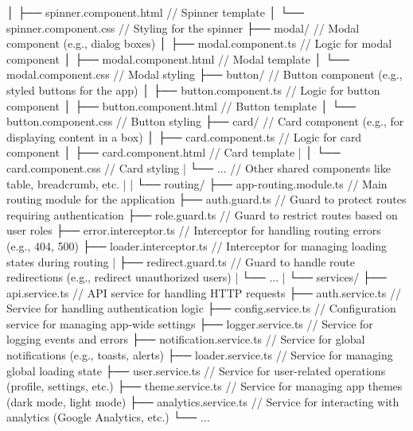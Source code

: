                 │   ├── spinner.component.html // Spinner template
                │   └── spinner.component.css  // Styling for the spinner
                ├── modal/                 // Modal component (e.g., dialog boxes)
                │   ├── modal.component.ts    // Logic for modal component
                │   ├── modal.component.html  // Modal template
                │   └── modal.component.css   // Modal styling
                ├── button/                // Button component (e.g., styled buttons for the app)
                │   ├── button.component.ts   // Logic for button component
                │   ├── button.component.html // Button template
                │   └── button.component.css  // Button styling
                ├── card/                  // Card component (e.g., for displaying content in a box)
                │   ├── card.component.ts     // Logic for card component
                │   ├── card.component.html   // Card template
        |       │   └── card.component.css    // Card styling
        |       └── ...                    // Other shared components like table, breadcrumb, etc.
        |
        |
        └── routing/
            ├── app-routing.module.ts       // Main routing module for the application
            ├── auth.guard.ts               // Guard to protect routes requiring authentication
            ├── role.guard.ts               // Guard to restrict routes based on user roles
            ├── error.interceptor.ts        // Interceptor for handling routing errors (e.g., 404, 500)
            ├── loader.interceptor.ts       // Interceptor for managing loading states during routing
        |   ├── redirect.guard.ts           // Guard to handle route redirections (e.g., redirect unauthorized users)
        |   └── ...
        |
        └── services/
            ├── api.service.ts                // API service for handling HTTP requests
            ├── auth.service.ts               // Service for handling authentication logic
            ├── config.service.ts            // Configuration service for managing app-wide settings
            ├── logger.service.ts            // Service for logging events and errors
            ├── notification.service.ts      // Service for global notifications (e.g., toasts, alerts)
            ├── loader.service.ts            // Service for managing global loading state
            ├── user.service.ts              // Service for user-related operations (profile, settings, etc.)
            ├── theme.service.ts             // Service for managing app themes (dark mode, light mode)
            ├── analytics.service.ts         // Service for interacting with analytics (Google Analytics, etc.)
            └── ...

